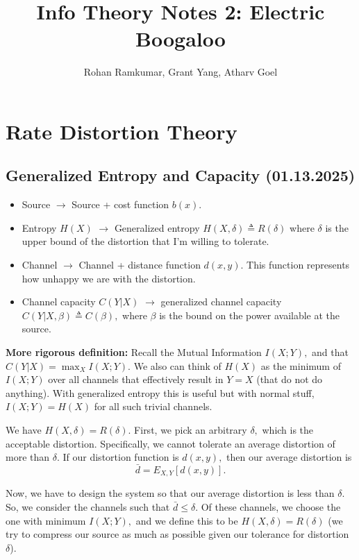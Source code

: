 \documentclass[12pt]{article}
\theoremstyle{remark}
\begin{document}
 
%
%
\title{Info Theory Notes 2: Electric Boogaloo}
\author{Rohan Ramkumar, Grant Yang, Atharv Goel}
\maketitle
\tableofcontents
\newpage
\section{Rate Distortion Theory}
\subsection{Generalized Entropy and Capacity (01.13.2025)}

\begin{itemize}
    \item Source $\to$ Source + cost function $b(x)$.
    \item Entropy $H(X)$ $\to$ Generalized entropy $H(X,\delta)\triangleq R(\delta)$ where $\delta$ is the upper bound of the distortion that I'm willing to tolerate.
    \item Channel $\to$ Channel + distance function $d(x,y).$ This function represents how unhappy we are with the distortion. 
    \item Channel capacity $C(Y|X)$ $\to$ generalized channel capacity $C(Y|X,\beta)\triangleq C(\beta),$ where $\beta$ is the bound on the power available at the source.
\end{itemize}
 

\textbf{More rigorous definition:}
Recall the Mutual Information $I(X;Y),$ and that $C(Y|X)=\max_{X}{I(X;Y)}.$ We also can think of $H(X)$ as the minimum of $I(X;Y)$ over all channels that effectively result in $Y=X$ (that do not do anything). With generalized entropy this is useful but with normal stuff, $I(X;Y) = H(X)$ for all such trivial channels.

We have $H(X,\delta)=R(\delta).$ First, we pick an arbitrary $\delta,$ which is the acceptable distortion. Specifically, we cannot tolerate an average distortion of more than $\delta.$ If our distortion function is $d(x,y),$ then our average distortion is
\[\bar{d}=E_{X,Y}[d(x,y)].\]

Now, we have to design the system so that our average distortion is less than $\delta.$ So, we consider the channels such that $\bar{d}\le\delta.$ Of these channels, we choose the one with minimum $I(X;Y),$ and we define this to be $H(X,\delta)=R(\delta)$ (we try to compress our source as much as possible given our tolerance for distortion $\delta$).
\end{document}
